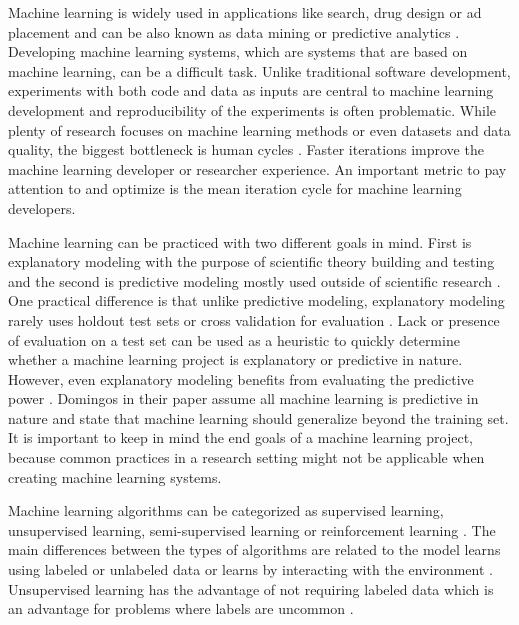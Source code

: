 Machine learning is widely used in applications like search, drug design or ad placement and can be also known as data mining or predictive analytics \parencite{domingosFewUsefulThings2012}. Developing machine learning systems, which are systems that are based on machine learning, can be a difficult task. Unlike traditional software development, experiments with both code and data as inputs are central to machine learning development \parencite{zahariaAcceleratingMachineLearning2018} and reproducibility of the experiments is often problematic. While plenty of research focuses on machine learning methods or even datasets and data quality, the biggest bottleneck is human cycles \parencite{domingosFewUsefulThings2012}. Faster iterations improve the machine learning developer or researcher experience. An important metric to pay attention to and optimize is the mean iteration cycle for machine learning developers.

Machine learning can be practiced with two different goals in mind. First is explanatory modeling with the purpose of scientific theory building and testing and the second is predictive modeling mostly used outside of scientific research \parencite{shmueliExplainPredict2010a}.
One practical difference is that unlike predictive modeling, explanatory modeling rarely uses holdout test sets or cross validation for evaluation \parencite{shmueliExplainPredict2010a}.
Lack or presence of evaluation on a test set can be used as a heuristic to quickly determine whether a machine learning project is explanatory or predictive in nature.
However, even explanatory modeling benefits from evaluating the predictive power \parencite{shmueliExplainPredict2010a}.
Domingos \parencite*{domingosFewUsefulThings2012} in their paper assume all machine learning is predictive in nature and state that machine learning should generalize beyond the training set.
It is important to keep in mind the end goals of a machine learning project, because common practices in a research setting might not be applicable when creating machine learning systems.

Machine learning algorithms can be categorized as supervised learning, unsupervised learning, semi-supervised learning or reinforcement learning \parencite{sarkerMachineLearningAlgorithms2021}.
The main differences between the types of algorithms are related to the model learns using labeled or unlabeled data or learns by interacting with the environment \parencite{sarkerMachineLearningAlgorithms2021}.
Unsupervised learning has the advantage of not requiring labeled data which is an advantage for problems where labels are uncommon \parencite{leBuildingHighlevelFeatures2012}.

